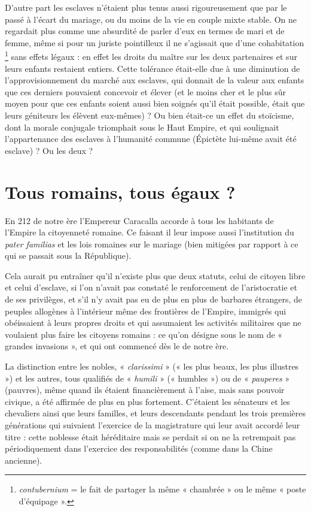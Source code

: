  D'autre part les esclaves n'étaient plus tenus aussi rigoureusement que par le passé à l'écart du mariage, ou du moins de la vie en couple mixte stable. On ne regardait plus comme une absurdité de parler d'eux en termes de mari et de femme, même si pour un juriste pointilleux il ne s'agissait que d'une cohabitation%
\footnote{\emph{contubernium} = le fait de partager la même « chambrée » ou le même « poste d'équipage ».}
sans effets légaux : en effet les droits du maître sur les deux partenaires et sur leurs enfants restaient entiers. Cette tolérance était-elle due à une diminution de l'approvisionnement du marché aux esclaves, qui donnait de la valeur aux enfants que ces derniers pouvaient concevoir et élever (et le moins cher et le plus sûr moyen pour que ces enfants soient aussi bien soignés qu'il était possible, était que leurs géniteurs les élèvent eux-mêmes) ? Ou bien était-ce un effet du stoïcisme, dont la morale conjugale triomphait sous le Haut Empire, et qui soulignait l'appartenance des esclaves à l'humanité commune ({Épictète} lui-même avait été esclave) ? Ou les deux ? 
 
\section{Tous romains, tous égaux ?}

 En 212 de notre ère l'Empereur Caracalla accorde à tous les habitants de l'Empire la citoyenneté romaine. Ce faisant il leur impose aussi l'institution du \emph{pater familias} et les lois romaines sur le mariage (bien mitigées par rapport à ce qui se passait sous la République). 

 Cela aurait pu entraîner qu'il n'existe plus que deux statuts, celui de citoyen libre et celui d'esclave, si l'on n'avait pas constaté le renforcement de l'aristocratie et de ses privilèges, et s'il n'y avait pas eu de plus en plus de barbares étrangers, de peuples allogènes à l'intérieur même des frontières de l'Empire, immigrés qui obéissaient à leurs propres droits et qui assumaient les activités militaires que ne voulaient plus faire les citoyens romains : ce qu'on désigne sous le nom de « grandes invasions », et qui ont commencé dès le  de notre ère. 

 La distinction entre les nobles, « \emph{clarissimi} » (« les plus beaux, les plus illustres ») et les autres, tous qualifiés de « \emph{humili} » (« humbles ») ou de « \emph{pauperes} » (pauvres), même quand ils étaient financièrement à l'aise, mais sans pouvoir civique, a été affirmée de plus en plus fortement. C'étaient les sénateurs et les chevaliers ainsi que leurs familles, et leurs descendants pendant les trois premières générations qui suivaient l'exercice de la magistrature qui leur avait accordé leur titre : cette noblesse était héréditaire mais se perdait si on ne la retrempait pas périodiquement dans l'exercice des responsabilités (comme dans la Chine ancienne).

